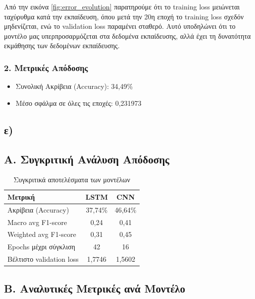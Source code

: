 \documentclass[a4paper,12pt]{article}
\begin{document}
Από την εικόνα \ref{fig:error_evolution} παρατηρούμε ότι το training loss μειώνεται ταχύρυθμα κατά την εκπαίδευση, όπου μετά 
την 20η εποχή το training loss σχεδόν μηδενίζεται, ενώ το validation loss παραμένει σταθερό. 
Αυτό υποδηλώνει ότι το μοντέλο μας υπερπροσαρμόζεται στα δεδομένα εκπαίδευσης,
αλλά έχει τη δυνατότητα εκμάθησης των δεδομένων εκπαίδευσης.

\subsubsection*{2. Μετρικές Απόδοσης}
\begin{itemize}
    \item Συνολική Ακρίβεια (Accuracy): 34,49\%
    \item Μέσο σφάλμα σε όλες τις εποχές: 0,231973
\end{itemize}


\subsection*{ε)}

\subsection*{Α. Συγκριτική Ανάλυση Απόδοσης}

\begin{table}[H]
    \centering
    \begin{tabular}{lcc}
    \toprule
    \textbf{Μετρική} & \textbf{LSTM} & \textbf{CNN} \\
    \midrule
    Ακρίβεια (Accuracy) & 37,74\% & 46,64\% \\
    Macro avg F1-score & 0,24 & 0,41 \\
    Weighted avg F1-score & 0,31 & 0,45 \\
    Epochs μέχρι σύγκλιση & 42 & 16 \\
    Βέλτιστο validation loss & 1,7746 & 1,5602 \\
    \bottomrule
    \end{tabular}
    \caption{Συγκριτικά αποτελέσματα των μοντέλων}
\end{table}

\subsection*{Β. Αναλυτικές Μετρικές ανά Μοντέλο}
\end{document}
